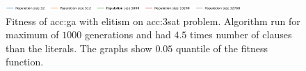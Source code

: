 \begin{figure}[ht!]
    \begin{minipage}{\textwidth}
        \centering
        \includegraphics[width=0.8\textwidth]{img/runs/fitness_ga_3SAT_legend.pdf}
    \end{minipage}

    \caption[Fitness of genetic algorithm with elitism]{Fitness of \acrlong{acc:ga} with elitism on \acrshort{acc:3sat} problem. Algorithm run for maximum of $1000$ generations and had $4.5$ times number of clauses than the literals. The graphs show $0.05$ quantile of the fitness function.}
\end{figure}






